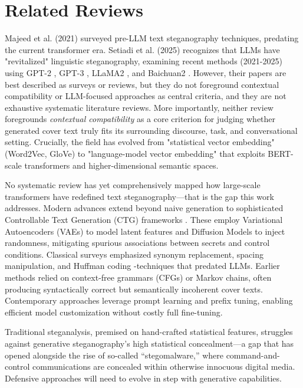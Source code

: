 \section{Related Reviews}

Majeed et al. (2021) \cite{math9212829} surveyed pre-LLM text steganography techniques, predating the current transformer era. Setiadi et al. (2025) \cite{Setiadi_Ghosal_Sahu_2025} recognizes that LLMs have "revitalized" linguistic steganography, examining recent methods (2021-2025) using GPT-2 \cite{radford2019gpt2}, GPT-3 \cite{brown2020language}, LLaMA2 \cite{xi2025rise}, and Baichuan2 \cite{xiao2024baichuan2}. However, their papers are best described as surveys or reviews, but they do not foreground contextual compatibility or LLM-focused approaches as central criteria, and they are not exhaustive systematic literature reviews. More importantly, neither review foregrounds \emph{contextual compatibility} as a core criterion for judging whether generated cover text truly fits its surrounding discourse, task, and conversational setting. Crucially, the field has evolved from "statistical vector embedding" (Word2Vec, GloVe) to "language-model vector embedding" that exploits BERT-scale transformers and higher-dimensional semantic spaces.

No systematic review has yet comprehensively mapped how large-scale transformers have redefined text steganography---that is the gap this work addresses. Modern advances extend beyond naive generation to sophisticated Controllable Text Generation (CTG) frameworks \cite{zhang2020linguistic}. These employ Variational Autoencoders (VAEs) to model latent features and Diffusion Models to inject randomness, mitigating spurious associations between secrets and control conditions. Classical surveys emphasized synonym replacement, spacing manipulation, and Huffman coding \cite{math9212829}-techniques that predated LLMs. Earlier methods relied on context-free grammars (CFGs) or Markov chains, often producing syntactically correct but semantically incoherent cover texts. Contemporary approaches leverage prompt learning and prefix tuning, enabling efficient model customization without costly full fine-tuning.

Traditional steganalysis, premised on hand-crafted statistical features, struggles against generative steganography's high statistical concealment---a gap that has opened alongside the rise of so-called ``stegomalware,'' where command-and-control communications are concealed within otherwise innocuous digital media. Defensive approaches will need to evolve in step with generative capabilities.
